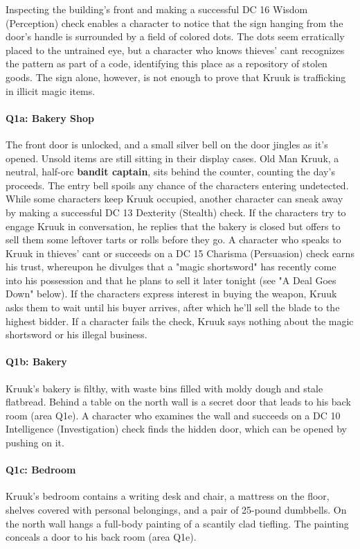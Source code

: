 \documentclass[10pt,a4,twoside,twocolumn,openany,nodeprecatedcode]{dndbook}
\begin{document}
Inspecting the building's front and making a successful DC 16 Wisdom (Perception) check enables a character to notice that the sign hanging from the door's handle is surrounded by a field of colored dots. The dots seem erratically placed to the untrained eye, but a character who knows thieves' cant recognizes the pattern as part of a code, identifying this place as a repository of stolen goods. The sign alone, however, is not enough to prove that Kruuk is trafficking in illicit magic items.
\paragraph{Q1a: Bakery Shop}
The front door is unlocked, and a small silver bell on the door jingles as it's opened. Unsold items are still sitting in their display cases. Old Man Kruuk, a neutral, half-orc \textbf{bandit captain}, sits behind the counter, counting the day's proceeds.
The entry bell spoils any chance of the characters entering undetected. While some characters keep Kruuk occupied, another character can sneak away by making a successful DC 13 Dexterity (Stealth) check.
If the characters try to engage Kruuk in conversation, he replies that the bakery is closed but offers to sell them some leftover tarts or rolls before they go.
A character who speaks to Kruuk in thieves' cant or succeeds on a DC 15 Charisma (Persuasion) check earns his trust, whereupon he divulges that a "magic shortsword" has recently come into his possession and that he plans to sell it later tonight (see "A Deal Goes Down" below). If the characters express interest in buying the weapon, Kruuk asks them to wait until his buyer arrives, after which he'll sell the blade to the highest bidder. If a character fails the check, Kruuk says nothing about the magic shortsword or his illegal business.
\paragraph{Q1b: Bakery}
Kruuk's bakery is filthy, with waste bins filled with moldy dough and stale flatbread. Behind a table on the north wall is a secret door that leads to his back room (area Q1e). A character who examines the wall and succeeds on a DC 10 Intelligence (Investigation) check finds the hidden door, which can be opened by pushing on it.
\paragraph{Q1c: Bedroom}
Kruuk's bedroom contains a writing desk and chair, a mattress on the floor, shelves covered with personal belongings, and a pair of 25-pound dumbbells. On the north wall hangs a full-body painting of a scantily clad tiefling. The painting conceals a door to his back room (area Q1e).
\end{document}
